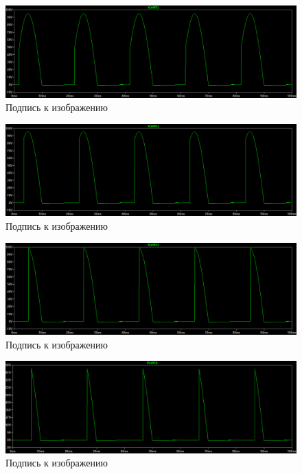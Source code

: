 \documentclass[a4paper, 12pt]{article}
\begin{document}
    \begin{figure}[H]
        \centering
        \includegraphics[scale=0.45]{a30_L20m_D.png}
        \captionsetup{skip=0pt}
        \caption{Подпись к изображению}
        \label{fig:a30_L20m_D}
    \end{figure}
    \begin{figure}[H]
        \centering
        \includegraphics[scale=0.45]{a60_L20m_D.png}
        \captionsetup{skip=0pt}
        \caption{Подпись к изображению}
        \label{fig:a60_L20m_D}
    \end{figure}
    \begin{figure}[H]
        \centering
        \includegraphics[scale=0.45]{a90_L20m_D.png}
        \captionsetup{skip=0pt}
        \caption{Подпись к изображению}
        \label{fig:a90_L20m_D}
    \end{figure}
    \begin{figure}[H]
        \centering
        \includegraphics[scale=0.45]{a120_L20m_D.png}
        \captionsetup{skip=0pt}
        \caption{Подпись к изображению}
        \label{fig:a120_L20m_D}
    \end{figure}
\end{document}
